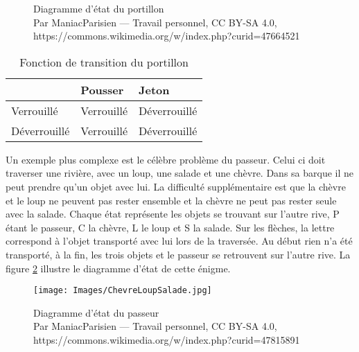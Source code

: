 \begin{figure}[h]
	\centering
	\caption{Diagramme d'état du portillon \\{\footnotesize
			Par ManiacParisien — Travail personnel, CC BY-SA 4.0, https://commons.wikimedia.org/w/index.php?curid=47664521}}
	\label{diagrammeetat}
\end{figure}


\begin{table}[h]
	\centering
	
	\begin{tabular}{|l|l|l|}
		\hline
		& Pousser    & Jeton       \\ \hline
		Verrouillé   & Verrouillé & Déverrouillé \\ \hline
		Déverrouillé & Verrouillé & Déverrouillé \\ \hline
	\end{tabular}
	\caption{Fonction de transition du portillon}
	\label{FTPortillon}
\end{table}  

Un exemple plus complexe est le célèbre problème du passeur. Celui ci doit traverser une rivière, avec un loup, une salade et une chèvre. Dans sa barque il ne peut prendre qu'un objet avec lui. La difficulté supplémentaire est que la chèvre et le loup ne peuvent pas rester ensemble et la chèvre ne peut pas rester seule avec la salade. Chaque état représente les objets se trouvant sur l'autre rive, P étant le passeur, C la chèvre, L le loup et S la salade. Sur les flèches, la lettre correspond à l'objet transporté avec lui lors de la traversée. Au début rien n'a été transporté, à la fin, les trois objets et le passeur se retrouvent sur l'autre rive.
La figure \ref{Salade} illustre le diagramme d'état de cette énigme.
\begin{figure}[h]
	\centering
	\texttt{[image: Images/ChevreLoupSalade.jpg]}
	\caption{Diagramme d'état du passeur \\{\footnotesize Par ManiacParisien — Travail personnel, CC BY-SA 4.0, https://commons.wikimedia.org/w/index.php?curid=47815891}}
	\label{Salade}
\end{figure}

